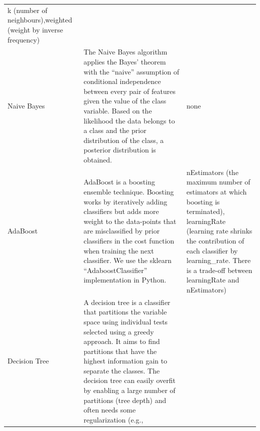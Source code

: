 \documentclass[]{book}
\begin{document}
\begin{longtable}[]{@{}lll@{}}
\begin{minipage}[t]{0.25\columnwidth}
k (number of neighbours),weighted (weight by inverse frequency)\strut
\end{minipage}\tabularnewline
\begin{minipage}[t]{0.12\columnwidth}\raggedright\strut
Naive Bayes\strut
\end{minipage} & \begin{minipage}[t]{0.55\columnwidth}\raggedright\strut
The Naive Bayes algorithm applies the Bayes' theorem with the ``naive''
assumption of conditional independence between every pair of features
given the value of the class variable. Based on the likelihood the data
belongs to a class and the prior distribution of the class, a posterior
distribution is obtained.\strut
\end{minipage} & \begin{minipage}[t]{0.25\columnwidth}\raggedright\strut
none\strut
\end{minipage}\tabularnewline
\begin{minipage}[t]{0.12\columnwidth}\raggedright\strut
AdaBoost\strut
\end{minipage} & \begin{minipage}[t]{0.55\columnwidth}\raggedright\strut
AdaBoost is a boosting ensemble technique. Boosting works by iteratively
adding classifiers but adds more weight to the data-points that are
misclassified by prior classifiers in the cost function when training
the next classifier. We use the sklearn ``AdaboostClassifier''
implementation in Python.\strut
\end{minipage} & \begin{minipage}[t]{0.25\columnwidth}\raggedright\strut
nEstimators (the maximum number of estimators at which boosting is
terminated), learningRate (learning rate shrinks the contribution of
each classifier by learning\_rate. There is a trade-off between
learningRate and nEstimators)\strut
\end{minipage}\tabularnewline
\begin{minipage}[t]{0.12\columnwidth}\raggedright\strut
Decision Tree\strut
\end{minipage} & \begin{minipage}[t]{0.55\columnwidth}\raggedright\strut
A decision tree is a classifier that partitions the variable space using
individual tests selected using a greedy approach. It aims to find
partitions that have the highest information gain to separate the
classes. The decision tree can easily overfit by enabling a large number
of partitions (tree depth) and often needs some regularization (e.g.,

\end{minipage}
\end{longtable}
\end{document}
